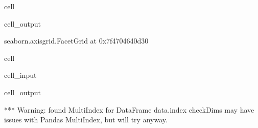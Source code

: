 \documentclass[letterpaper,table,10pt,english]{jupyterBook}
\begin{document}
\begin{sphinxuseclass}{cell}
\begin{sphinxVerbatimOutput}
\begin{sphinxuseclass}{cell_output}
\begin{sphinxVerbatim}[commandchars=\\\{\}]
\PYGZlt{}seaborn.axisgrid.FacetGrid at 0x7f4704640d30\PYGZgt{}
\end{sphinxVerbatim}

\noindent{}

\end{sphinxuseclass}\end{sphinxVerbatimOutput}

\end{sphinxuseclass}
\begin{sphinxuseclass}{cell}\begin{sphinxVerbatimInput}

\begin{sphinxuseclass}{cell_input}
\begin{sphinxVerbatim}[commandchars=\\\{\}]
   
       
                      
\end{sphinxVerbatim}

\end{sphinxuseclass}\end{sphinxVerbatimInput}
\begin{sphinxVerbatimOutput}

\begin{sphinxuseclass}{cell_output}
\begin{sphinxVerbatim}[commandchars=\\\{\}]
*** Warning: found MultiIndex for DataFrame data.index \PYGZhy{} checkDims may have issues with Pandas MultiIndex, but will try anyway.
\end{sphinxVerbatim}


\end{sphinxuseclass}
\end{sphinxVerbatimOutput}
\end{sphinxuseclass}
\end{document}
